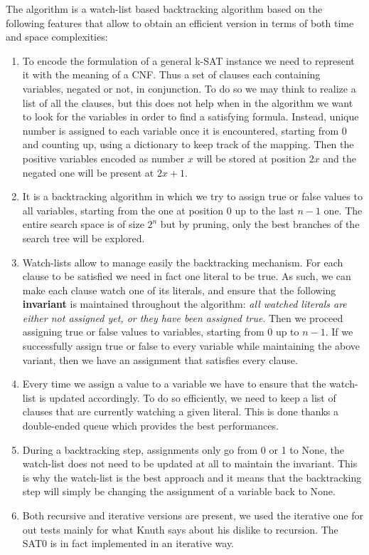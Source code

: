 \documentclass[english]{article}
\begin{document}
				The algorithm is a watch-list based backtracking algorithm based on the following features that allow to obtain an efficient version in terms of both time and space complexities:
				
				\begin{enumerate}[label=(\roman*)]
					\item To encode the formulation of a general k-SAT instance we need to represent it with the meaning of a CNF. Thus a set of clauses each containing variables, negated or not, in conjunction. To do so we may think to realize a list of all the clauses, but this does not help when in the algorithm we want to look for the variables in order to find a satisfying formula. Instead, unique number is assigned to each variable once it is encountered, starting from 0 and counting up, using a dictionary to keep track of the mapping. Then the positive variables encoded as number $x$ will be stored at position $2x$ and the negated one will be present at $2x+1$.
					
					\item It is a backtracking algorithm in which we try to assign true or false values to all variables, starting from the one at position 0 up to the last $n - 1$ one. The entire search space is of size $2^n$ but by pruning, only the best branches of the search tree will be explored.
					
					\item Watch-lists allow to manage easily the backtracking mechanism. For each clause to be satisfied we need in fact one literal to be true. As such, we can make each clause watch one of its literals, and ensure that the following \textbf{invariant} is maintained throughout the algorithm: \emph{all watched literals are either not assigned yet, or they have been assigned true}. Then we proceed assigning true or false values to variables, starting from 0 up to $n-1$. If we successfully assign true or false to every variable while maintaining the above variant, then we have an assignment that satisfies every clause.
					
					\item Every time we assign a value to a variable we have to ensure that the watch-list is updated accordingly. To do so efficiently, we need to keep a list of clauses that are currently watching a given literal. This is done thanks a double-ended queue which provides the best performances.
					
					\item During a backtracking step, assignments only go from 0 or 1 to None, the watch-list does not need to be updated at all to maintain the invariant. This is why the watch-list is the best approach and it means that the backtracking step will simply be changing the assignment of a variable back to None.
					
					\item Both recursive and iterative versions are present, we used the iterative one for out tests mainly for what Knuth says about his dislike to recursion. The SAT0 is in fact implemented in an iterative way.
				\end{enumerate}
			
\end{document}
